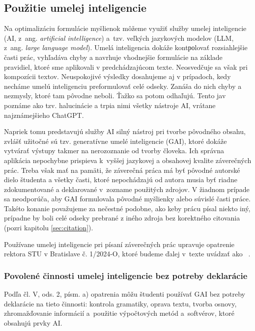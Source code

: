 \documentclass[../../../thesis.tex]{subfiles}
\begin{document}
\subsection{Použitie umelej inteligencie}\label{sec:utilizingAI}
Na optimalizáciu formulácie myšlienok môžeme využiť služby
umelej inteligencie (AI, z~ang. \emph{\foreignlanguage{english}{artificial intelligence}}) a~tzv. veľkých jazykových modelov (LLM, z~ang. \emph{\foreignlanguage{english}{large language model}}).
Umelá inteligencia dokáže kontроlovať rozsiahlejšie časti prác,
vyhľadáva chyby a navrhuje vhodnejšie
formulácie na základe pravidiel,
ktoré sme aplikovali v predchádzajúcom texte.
Neosvedčuje sa však pri kompozícii textov.
Neuspokojivé výsledky dosahujeme aj v prípadoch,
kedy necháme umelú inteligenciu preformulovať celé odseky.
Zanáša do nich chyby a nezmysly, ktoré tam pôvodne neboli.
Ťažko sa potom odhaľujú.
Tento jav poznáme ako tzv.
halucinácie a trpia nimi všetky nástroje AI,
vrátane najznámejšieho ChatGPT.

Napriek tomu predstavujú služby AI silný nástroj pri tvorbe pôvodného obsahu, zvlášť užitočné sú tzv. generatívne umelé inteligencie (GAI),
ktoré dokáže vytvárať výstupy takmer na nerozoznanie od tvorby človeka.
Ich správna aplikácia nepochybne prispieva k~vyššej jazykovej a obsahovej kvalite záverečných prác.
Treba však mať na pamäti, že záverečná práca má byť
pôvodné autorské dielo študenta a všetky časti,
ktoré nepochádzajú od autora musia byť riadne
zdokumentované a deklarované v~zozname použitých zdrojov.
V žiadnom prípade sa neodporúča, aby
GAI formulovala pôvodné myšlienky
alebo súvislé časti práce.
Takéto konanie považujeme za nečestné podobne,
ako keby prácu písal niekto iný,
prípadne by boli celé odseky prebrané z iného zdroja bez korektného citovania (pozri kapitolu \ref{sec:citation}).

Používane umelej inteligencie pri písaní záverečných prác
upravuje opatrenie rektora STU v Bratislave č. 1/2024-O, ktoré budeme ďalej v~texte uvádzať ako ~\cite{opatrenie12024}.

\subsubsection*{Povolené činnosti umelej inteligencie bez potreby deklarácie}
Podľa čl. V, ods. 2, písm. a) opatrenia môžu študenti používať GAI bez potreby deklarácie na tieto činnosti: kontrola gramatiky, oprava textu, tvorba osnovy, zhromažďovanie informácií a~použitie výpočtových metód a~softvérov, ktoré obsahujú prvky AI.
\end{document}
